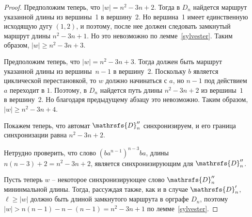 \documentclass[11pt]{article}
\newcommand{\sw}{reset word}
\begin{document}
\begin{proof}
Предположим теперь, что $|w|=n^2-3n+2$. Тогда в $D_n$ найдется маршрут указанной длины из 
вершины~1 в вершину~2. Но вершина~1 имеет единственную исходящую дугу $(1,2)$, и поэтому,
после нее должен следовать замкнутый маршрут длины $n^2-3n+1$. Но это невозможно по 
лемме~\ref{sylvester}. Таким образом, $|w|\ge n^2-3n+3$.


Предположим теперь, что $|w|=n^2-3n+3$. Тогда должен быть маршрут указанной длины из вершины~$n-1$
в вершину~2. Поскольку $b$ является циклической перестановкой, то $w$ должно начинаться с $a$, 
но $n - 1$ под действием $a$ переходит в $1$. Поэтому, в $D_n$ найдется 
путь длины $n^2-3n+2$ из вершины~$1$ в вершину~2.
Но благодаря предыдущему абзацу это невозможно. Таким образом, $|w|\ge n^2-3n+4$.



\medskip

Покажем теперь, что автомат $\mathrsfs{D}''_n$ синхронизируем, и его граница синхронизации
равна $n^2-3n+2$.

Нетрудно проверить, что слово $(ba^{n - 1})^{n - 3}ba$, длины $n(n - 3) + 2 = n^2 -3n + 2$,
является синхронизирующим для $\mathrsfs{D}''_n$.

Пусть теперь $w$ -- некоторое синхронизирующее слово $\mathrsfs{D}''_n$ мининмальной длины. 
Тогда, рассуждая также, как и в случае $\mathrsfs{D}'_n$,
$\ell\ge|w|$ должно быть длиной замкнутого маршрута в орграфе $D_n$, поэтому
$|w|>n(n-1)-n-(n-1)=n^2-3n+1$ по лемме~\ref{sylvester}.



%
%
\end{proof}
\end{document}
